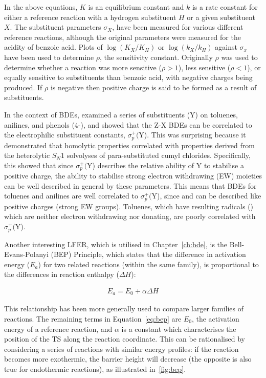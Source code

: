 \noindent In the above equations, $K$ is an equilibrium constant and $k$ is a rate constant for either a reference reaction with a hydrogen substituent $H$ or a given substituent $X$. The substituent parameters $\sigma_X$, have been measured for various different reference reactions, although the original parameters were measured for the acidity of benzoic acid.\cite{Hammett1937} Plots of $\log(K_X/K_H)$ or $\log(k_X/k_H)$ against $\sigma_x$ have been used to determine $\rho$, the sensitivity constant. Originally $\rho$ was used to determine whether a reaction was more sensitive ($\rho > 1$), less sensitive ($\rho < 1$), or equally sensitive to substituents than benzoic acid, with negative charges being produced. If $\rho$ is negative then positive charge is said to be formed as a result of substituents.

In the context of BDEs, \citet{Pratt2004} examined a series of substituents (Y) on toluenes, anilines, and phenols (4-), and showed that the Z-X BDEs can be correlated to the electrophilic substituent constants, $\sigma_p^+($Y). This was surprising because it demonstrated that homolytic properties correlated with properties derived from the heterolytic $S_N1$ solvolyses of para-substituted cumyl chlorides.\cite{Brown1958} Specifically, this showed that since $\sigma_p^+($Y) describes the relative ability of Y to stabilise a positive charge, the ability to stabilise strong electron withdrawing (EW) moieties can be well described in general by these parameters. This means that BDEs for toluenes and anilines are well correlated to $\sigma_p^+($Y), since  and  can be described like positive charges (strong EW groups). Toluenes, which have resulting radicals () which are neither electron withdrawing nor donating, are poorly correlated with $\sigma_p^+($Y).

Another interesting LFER, which is utilised in Chapter~\ref{ch:bde}, is the Bell-Evans-Polanyi (BEP) Principle,\cite{Bell1936,Evans1938} which states that the difference in activation energy ($E_a$) for two related reactions (within the same family), is proportional to the differences in reaction enthalpy ($\Delta H$):

\begin{align}
  E_a = E_0 + \alpha \Delta H
  \label{eq:bep}
\end{align}

\noindent This relationship has been more generally used to compare larger families of reactions. The remaining terms in Equation~\ref{eq:bep} are $E_0$, the activation energy of a reference reaction, and $\alpha$ is a constant which characterises the position of the TS along the reaction coordinate. This can be rationalised by considering a series of reactions with similar energy profiles: if the reaction becomes more exothermic, the barrier height will decrease (the opposite is also true for endothermic reactions), as illustrated in~\ref{fig:bep}.


